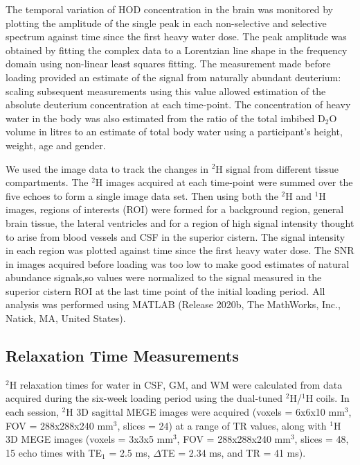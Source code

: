 \documentclass[class=article, crop=false]{standalone}
\begin{document}
The temporal variation of HOD concentration in the brain was monitored by plotting the amplitude of the single peak in each non-selective and selective spectrum against time since the first heavy water dose. The peak amplitude was obtained by fitting the complex data to a Lorentzian line shape in the frequency domain using non-linear least squares fitting. The measurement made before loading provided an estimate of the signal from naturally abundant deuterium: scaling subsequent measurements using this value allowed estimation of the absolute deuterium concentration at each time-point. The concentration of heavy water in the body was also estimated from the ratio of the total imbibed D$_2$O volume in litres to an estimate of total body water using a participant’s height, weight, age and gender\cite{Watson1980TotalMeasurements}.

We used the image data to track the changes in $^2$H signal from different tissue compartments. The $^2$H images acquired at each time-point were summed over the five echoes to form a single image data set. Then using both the $^2$H and $^1$H images, regions of interests (ROI) were formed for a background region, general brain tissue, the lateral ventricles and for a region of high signal intensity thought to arise from blood vessels and CSF in the superior cistern. The signal intensity in each region was plotted against time since the first heavy water dose. The SNR in images acquired before loading was too low to make good estimates of natural abundance signals,so values were normalized to the signal measured in the superior cistern ROI at the last time point of the initial loading period. All analysis was performed using MATLAB (Release 2020b, The MathWorks, Inc., Natick, MA, United States).

\subsection{Relaxation Time Measurements}
\label{section:D2O:Relaxation}

$^2$H relaxation times for water in CSF, GM, and WM were calculated from data acquired during the six-week loading period using the dual-tuned $^2$H/$^1$H coils. In each session, $^2$H 3D sagittal MEGE images were acquired (voxels = 6x6x10 mm$^3$, FOV = 288x288x240 mm$^3$, slices = 24) at a range of TR values, along with $^1$H 3D MEGE images (voxels = 3x3x5 mm$^3$, FOV = 288x288x240 mm$^3$, slices = 48, 15 echo times with TE$_1$ = 2.5 ms, $\Delta$TE = 2.34 ms, and TR = 41 ms). 
\end{document}
